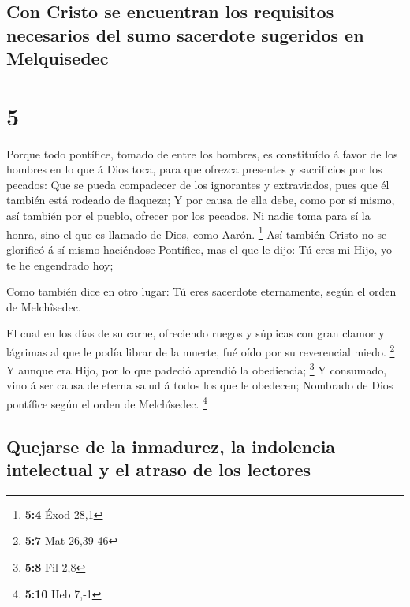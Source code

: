 \hypertarget{con-cristo-se-encuentran-los-requisitos-necesarios-del-sumo-sacerdote-sugeridos-en-melquisedec}{%
\subsection{Con Cristo se encuentran los requisitos necesarios del sumo
sacerdote sugeridos en
Melquisedec}\label{con-cristo-se-encuentran-los-requisitos-necesarios-del-sumo-sacerdote-sugeridos-en-melquisedec}}

\hypertarget{section-4}{%
\section{5}\label{section-4}}

 Porque todo pontífice, tomado de entre los hombres, es
constituído á favor de los hombres en lo que á Dios toca, para que
ofrezca presentes y sacrificios por los pecados:  Que se
pueda compadecer de los ignorantes y extraviados, pues que él también
está rodeado de flaqueza;  Y por causa de ella debe, como
por sí mismo, así también por el pueblo, ofrecer por los pecados.
 Ni nadie toma para sí la honra, sino el que es llamado de
Dios, como Aarón. \footnote{\textbf{5:4} Éxod 28,1}  Así
también Cristo no se glorificó á sí mismo haciéndose Pontífice, mas el
que le dijo: Tú eres mi Hijo, yo te he engendrado hoy;

 Como también dice en otro lugar: Tú eres sacerdote
eternamente, según el orden de Melchîsedec.

 El cual en los días de su carne, ofreciendo ruegos y
súplicas con gran clamor y lágrimas al que le podía librar de la muerte,
fué oído por su reverencial miedo. \footnote{\textbf{5:7} Mat 26,39-46}
 Y aunque era Hijo, por lo que padeció aprendió la
obediencia; \footnote{\textbf{5:8} Fil 2,8}  Y consumado,
vino á ser causa de eterna salud á todos los que le obedecen;
 Nombrado de Dios pontífice según el orden de Melchîsedec.
\footnote{\textbf{5:10} Heb 7,-1}

\hypertarget{quejarse-de-la-inmadurez-la-indolencia-intelectual-y-el-atraso-de-los-lectores}{%
\subsection{Quejarse de la inmadurez, la indolencia intelectual y el
atraso de los
lectores}\label{quejarse-de-la-inmadurez-la-indolencia-intelectual-y-el-atraso-de-los-lectores}}

